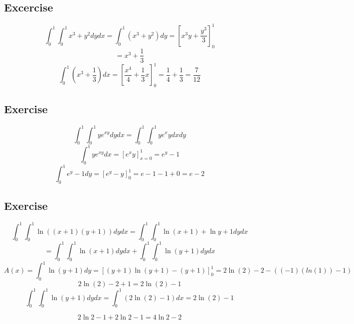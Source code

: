 \documentclass[12pt, oneside]{article}
\begin{document}
\subsection*{Excercise}
\[\int^1_0 \int^1_0 x^3+y^2 dydx = \int^1_0 (x^3+y^2) dy = \left[x^3 y +\frac{y^3}{3}\right]^1_0\]
\[=x^3+\frac{1}{3}\]
\[\int^1_0 (x^3+\frac{1}{3})dx = \left[\frac{x^4}{4}+\frac{1}{3}x\right]^1_0 = \frac{1}{4}+\frac{1}{3}=\frac{7}{12}\]

\subsection*{Exercise}
\[\int^1_0\int^1_0 ye^{xy}dydx=\int^1_0\int^1_0 ye^xy dxdy\]
\[\int^1_0 ye^{xy} dx = \left[e^xy\right]^1_{x=0}=e^y-1\]
\[\int^1_0 e^y -1 dy = \left[e^y-y\right]^1_0 = e-1-1+0=e-2\]
\subsection*{Exercise}
\[\int^1_0\int^1_0 \ln ((x+1)(y+1))dydx = \int^1_0\int^1_0 \ln (x+1)+\ln {y+1} dydx\]
\[=\int^1_0\int^1_0\ln (x+1)dydx +\int^1_0\int^1_0 \ln (y+1)dydx\]
\[A(x)=\int^1_0 \ln (y+1)dy =\left[(y+1)\ln (y+1) - (y+1)\right]^1_0 = 2\ln(2)-2 -((-1)(ln(1))-1)\]
\[2\ln(2) -2+1 = 2\ln(2)-1\]
\[\int^1_0\int^1_0 \ln(y+1)dydx = \int^1_0 (2\ln(2)-1)dx=2\ln(2)-1\]

\[2\ln2-1+2\ln2-1=4\ln2 -2\]
\end{document}
